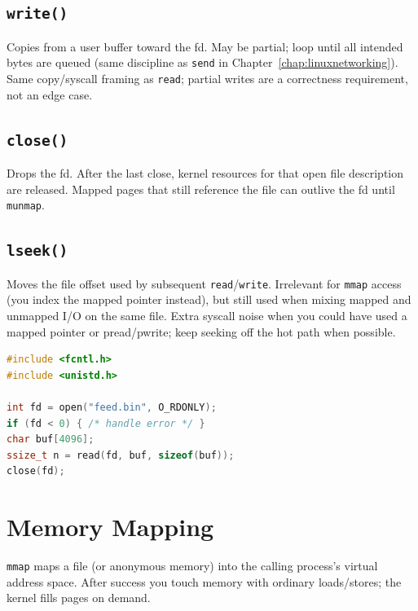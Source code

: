 \subsection{\texttt{write()}}
\label{subsec:write}
Copies from a user buffer toward the fd. May be partial; loop until all intended bytes are 
queued (same discipline as \texttt{send} in Chapter~\ref{chap:linuxnetworking}).
\newline
Same copy/syscall framing as \texttt{read}; partial writes are a correctness requirement, 
not an edge case.

\subsection{\texttt{close()}}
\label{subsec:close-file-io}
Drops the fd. After the last close, kernel resources for that open file description are released. 
Mapped pages that still reference the file can outlive the fd until \texttt{munmap}.

\subsection{\texttt{lseek()}}
\label{subsec:lseek}
Moves the file offset used by subsequent \texttt{read}/\texttt{write}. Irrelevant for 
\texttt{mmap} access (you index the mapped pointer instead), but still used when mixing 
mapped and unmapped I/O on the same file.
\newline
Extra syscall noise when you could have used a mapped pointer or pread/pwrite; keep seeking 
off the hot path when possible.

\begin{lstlisting}[language=C++]
#include <fcntl.h>
#include <unistd.h>

int fd = open("feed.bin", O_RDONLY);
if (fd < 0) { /* handle error */ }
char buf[4096];
ssize_t n = read(fd, buf, sizeof(buf));
close(fd);
\end{lstlisting}

\section{Memory Mapping}
\label{sec:memory-mapping}
\texttt{mmap} maps a file (or anonymous memory) into the calling process's virtual address space. 
After success you touch memory with ordinary loads/stores; the kernel fills pages on demand.

